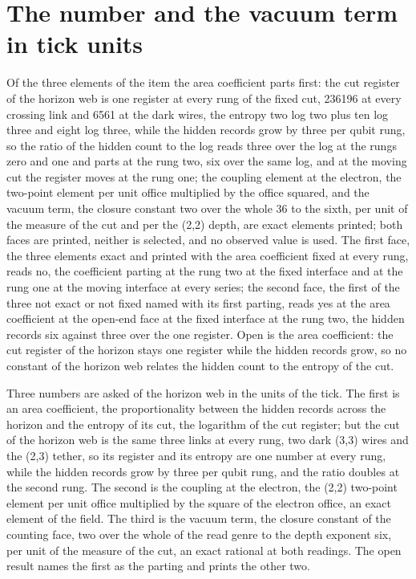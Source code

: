 \section{The number and the vacuum term in tick units}\label{mod:IX-2-D543234-w-nmvt}
\begin{chwall}\label{box:IX-2-D543234-w-nmvt:1}
Of the three elements of the item the area coefficient parts first: the cut register of the horizon web is one register at every rung of the fixed cut, 236196 at every crossing link and 6561 at the dark wires, the entropy two log two plus ten log three and eight log three, while the hidden records grow by three per qubit rung, so the ratio of the hidden count to the log reads three over the log at the rungs zero and one and parts at the rung two, six over the same log, and at the moving cut the register moves at the rung one; the coupling element at the electron, the two-point element per unit office multiplied by the office squared, and the vacuum term, the closure constant two over the whole 36 to the sixth, per unit of the measure of the cut and per the (2,2) depth, are exact elements printed; both faces are printed, neither is selected, and no observed value is used.
The first face, the three elements exact and printed with the area coefficient fixed at every rung, reads no, the coefficient parting at the rung two at the fixed interface and at the rung one at the moving interface at every series; the second face, the first of the three not exact or not fixed named with its first parting, reads yes at the area coefficient at the open-end face at the fixed interface at the rung two, the hidden records six against three over the one register. Open is the area coefficient: the cut register of the horizon stays one register while the hidden records grow, so no constant of the horizon web relates the hidden count to the entropy of the cut.
\end{chwall}
Three numbers are asked of the horizon web in the units of the tick. The first is an area coefficient, the proportionality between the hidden records across the horizon and the entropy of its cut, the logarithm of the cut register; but the cut of the horizon web is the same three links at every rung, two dark (3,3) wires and the (2,3) tether, so its register and its entropy are one number at every rung, while the hidden records grow by three per qubit rung, and the ratio doubles at the second rung. The second is the coupling at the electron, the (2,2) two-point element per unit office multiplied by the square of the electron office, an exact element of the field. The third is the vacuum term, the closure constant of the counting face, two over the whole of the read genre to the depth exponent six, per unit of the measure of the cut, an exact rational at both readings. The open result names the first as the parting and prints the other two.
